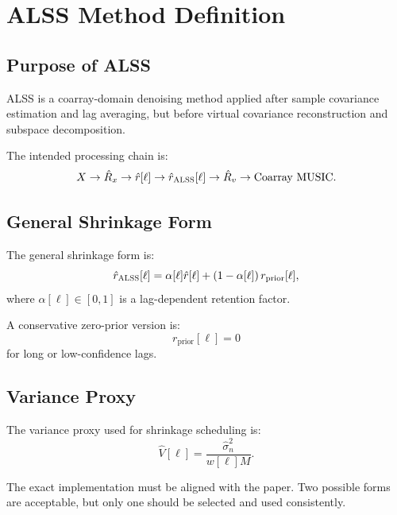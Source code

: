 \documentclass[11pt,letterpaper]{article}
\newcommand{\ALSS}{\textsc{ALSS}}
\begin{document}
\section{ALSS Method Definition}

\subsection{Purpose of ALSS}

\ALSS{} is a coarray-domain denoising method applied after sample covariance estimation and lag averaging, but before virtual covariance reconstruction and subspace decomposition.

The intended processing chain is:
\begin{equation}
    X \rightarrow \hat{R}_x \rightarrow \hat{r}[\ell] \rightarrow \hat{r}_{\ALSS}[\ell] \rightarrow \hat{R}_v \rightarrow \text{Coarray MUSIC} .
\end{equation}

\subsection{General Shrinkage Form}

The general shrinkage form is:
\begin{equation}
    \hat{r}_{\ALSS}[\ell]
    = \alpha[\ell]\hat{r}[\ell] + \left(1-\alpha[\ell]\right) r_{\mathrm{prior}}[\ell],
    \label{eq:alss_general}
\end{equation}
where $\alpha[\ell]\in[0,1]$ is a lag-dependent retention factor.

A conservative zero-prior version is:
\begin{equation}
    r_{\mathrm{prior}}[\ell]=0
\end{equation}
for long or low-confidence lags.

\subsection{Variance Proxy}

The variance proxy used for shrinkage scheduling is:
\begin{equation}
    \hat{V}[\ell] = \frac{\hat{\sigma}_n^2}{w[\ell]M} .
\end{equation}

The exact implementation must be aligned with the paper. Two possible forms are acceptable, but only one should be selected and used consistently.
\end{document}
